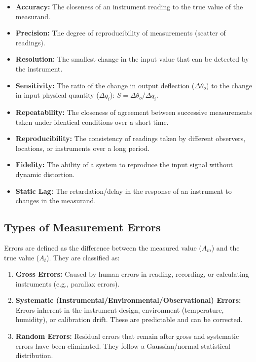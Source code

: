 \documentclass[12pt,a4paper]{article}
\begin{document}
\begin{tcolorbox}[defbox, title={\textbf{Key Static Characteristics}}]
\begin{itemize}[leftmargin=*, itemsep=3.5pt, topsep=0pt]
  \item \textbf{Accuracy:} The closeness of an instrument reading to the true value of the measurand.
  \item \textbf{Precision:} The degree of reproducibility of measurements (scatter of readings).
  \item \textbf{Resolution:} The smallest change in the input value that can be detected by the instrument.
  \item \textbf{Sensitivity:} The ratio of the change in output deflection ($\Delta \theta_o$) to the change in input physical quantity ($\Delta q_i$): $S = \Delta \theta_o / \Delta q_i$.
  \item \textbf{Repeatability:} The closeness of agreement between successive measurements taken under identical conditions over a short time.
  \item \textbf{Reproducibility:} The consistency of readings taken by different observers, locations, or instruments over a long period.
  \item \textbf{Fidelity:} The ability of a system to reproduce the input signal without dynamic distortion.
  \item \textbf{Static Lag:} The retardation/delay in the response of an instrument to changes in the measurand.
\end{itemize}
\end{tcolorbox}

\subsection{Types of Measurement Errors}
Errors are defined as the difference between the measured value ($A_m$) and the true value ($A_t$). They are classified as:
\begin{enumerate}[label=\alph*., leftmargin=*]
  \item \textbf{Gross Errors:} Caused by human errors in reading, recording, or calculating instruments (e.g., parallax errors).
  \item \textbf{Systematic (Instrumental/Environmental/Observational) Errors:} Errors inherent in the instrument design, environment (temperature, humidity), or calibration drift. These are predictable and can be corrected.
  \item \textbf{Random Errors:} Residual errors that remain after gross and systematic errors have been eliminated. They follow a Gaussian/normal statistical distribution.
\end{enumerate}
\end{document}
